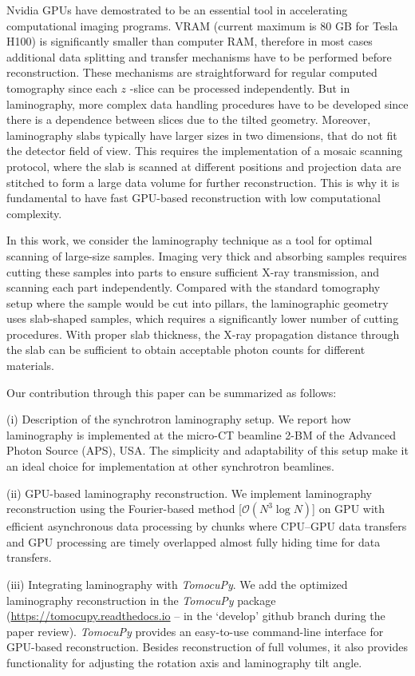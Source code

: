 \documentclass{article}
\begin{document}
Nvidia GPUs have demostrated to be an essential tool in accelerating computational imaging programs. VRAM (current maximum is 80 GB for Tesla H100) is significantly smaller than computer RAM, therefore in most cases additional data splitting and transfer mechanisms have to be performed before reconstruction. These mechanisms are straightforward for regular computed tomography since each $z$ -slice can be processed independently. But in laminography, more complex data handling procedures have to be developed since there is a dependence between slices due to the tilted geometry. Moreover, laminography slabs typically have larger sizes in two dimensions, that do not fit the detector field of view. This requires the implementation of a mosaic scanning protocol, where the slab is scanned at different positions and projection data are stitched to form a large data volume for further reconstruction. This is why it is fundamental to have fast GPU-based reconstruction with low computational complexity.

In this work, we consider the laminography technique as a tool for optimal scanning of large-size samples. Imaging very thick and absorbing samples requires cutting these samples into parts to ensure sufficient X-ray transmission, and scanning each part independently. Compared with the standard tomography setup where the sample would be cut into pillars, the laminographic geometry uses slab-shaped samples, which requires a significantly lower number of cutting procedures. With proper slab thickness, the X-ray propagation distance through the slab can be sufficient to obtain acceptable photon counts for different materials.

Our contribution through this paper can be summarized as follows:

(i) Description of the synchrotron laminography setup. We report how laminography is implemented at the micro-CT beamline 2-BM of the Advanced Photon Source (APS), USA. The simplicity and adaptability of this setup make it an ideal choice for implementation at other synchrotron beamlines.

(ii) GPU-based laminography reconstruction. We implement laminography reconstruction using the Fourier-based method [$\mathcal{O}(N^3 \log N)$] on GPU with efficient asynchronous data processing by chunks where CPU–GPU data transfers and GPU processing are timely overlapped almost fully hiding time for data transfers.

(iii) Integrating laminography with \emph{TomocuPy}. We add the optimized laminography reconstruction in the \emph{TomocuPy} package (\url{https://tomocupy.readthedocs.io} – in the ‘develop’ github branch during the paper review). \emph{TomocuPy} provides an easy-to-use command-line interface for GPU-based reconstruction. Besides reconstruction of full volumes, it also provides functionality for adjusting the rotation axis and laminography tilt angle.
\end{document}
